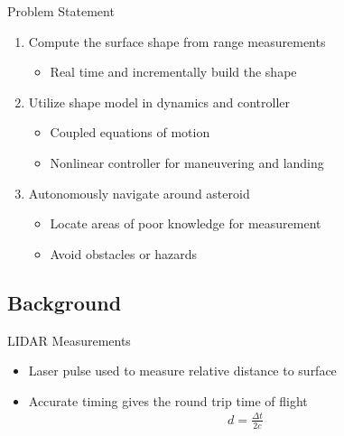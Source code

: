 \begin{frame}{Problem Statement}
\begin{enumerate}
    \item<1-> Compute the surface shape from range measurements
        \begin{itemize}
            \item Real time and incrementally build the shape
        \end{itemize}
    \item<2-> Utilize shape model in dynamics and controller
        \begin{itemize}
            \item Coupled equations of motion 
            \item Nonlinear controller for maneuvering and landing
        \end{itemize}
    \item<3-> Autonomously navigate around asteroid 
        \begin{itemize}
            \item Locate areas of poor knowledge for measurement
            \item Avoid obstacles or hazards
        \end{itemize}
\end{enumerate}
\end{frame}

\subsection{Background}

\begin{frame}{LIDAR Measurements }
    \begin{itemize}
        \item<1-> Laser pulse used to measure relative distance to surface
        \item<1-> Accurate timing gives the round trip time of flight
            \begin{align*}
                d = \frac{\Delta t}{2 c}
            \end{align*}
    \end{itemize}
    \pause 
    \begin{center}
    \end{center}
\end{frame}

